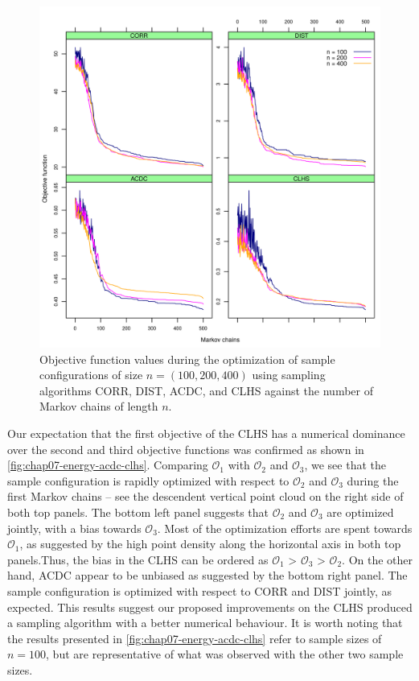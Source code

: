 \begin{figure}[!ht]
 \centering
 \includegraphics[width=\textwidth]{fig/chap07-energy-corr-dist-acdc-clhs}
 \caption[Objective function values during the optimization of three sample configurations using four sampling 
 algorithms.]{Objective function values during the optimization of sample configurations of size 
 $n = (100, 200, 400)$ using sampling algorithms CORR, DIST, ACDC, and CLHS against the number of Markov 
 chains of length $n$.}
 \label{fig:chap07-energy-all}
\end{figure}

Our expectation that the first objective of the CLHS has a numerical dominance over the second and third 
objective functions was confirmed as shown in \autoref{fig:chap07-energy-acdc-clhs}. Comparing $\mathcal{O}_1$ 
with $\mathcal{O}_2$ and $\mathcal{O}_3$, we see that the sample configuration is rapidly optimized with 
respect to $\mathcal{O}_2$ and $\mathcal{O}_3$ during the first Markov chains -- see the descendent vertical 
point cloud on the right side of both top panels. The bottom left panel suggests that $\mathcal{O}_2$ and 
$\mathcal{O}_3$ are optimized jointly, with a bias towards $\mathcal{O}_3$. Most of the optimization efforts 
are spent towards $\mathcal{O}_1$, as suggested by the high point density along the horizontal axis in both 
top panels.Thus, the bias in the CLHS can be ordered as $\mathcal{O}_1$ > $\mathcal{O}_3$ > $\mathcal{O}_2$. 
On the other hand, ACDC appear to be unbiased as suggested by the bottom right panel. The sample configuration 
is optimized with respect to CORR and DIST jointly, as expected. This results suggest our proposed 
improvements on the CLHS produced a sampling algorithm with a better numerical behaviour. It is worth noting 
that the results presented in \autoref{fig:chap07-energy-acdc-clhs} refer to sample sizes of $n = 100$, but 
are representative of what was observed with the other two sample sizes.


